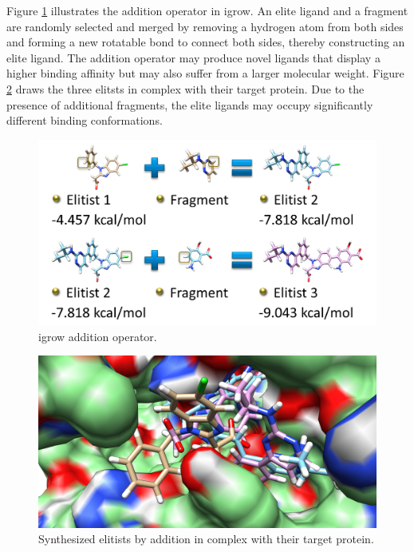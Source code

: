 \documentclass[10pt, conference, compsocconf]{IEEEtran}
\begin{document}
Figure \ref{igrow:Addition} illustrates the addition operator in igrow. An elite ligand and a fragment are randomly selected and merged by removing a hydrogen atom from both sides and forming a new rotatable bond to connect both sides, thereby constructing an elite ligand. The addition operator may produce novel ligands that display a higher binding affinity but may also suffer from a larger molecular weight. Figure \ref{igrow:AdditionComplex} draws the three elitsts in complex with their target protein. Due to the presence of additional fragments, the elite ligands may occupy significantly different binding conformations.

\begin{figure}
\centering
\includegraphics[width=\textwidth]{../igrow/Addition.png}
\caption{igrow addition operator.}
\label{igrow:Addition}
\end{figure}

\begin{figure}
\centering
\includegraphics[width=\textwidth]{../igrow/AdditionComplex.png}
\caption{Synthesized elitists by addition in complex with their target protein.}
\label{igrow:AdditionComplex}
\end{figure}
\end{document}
